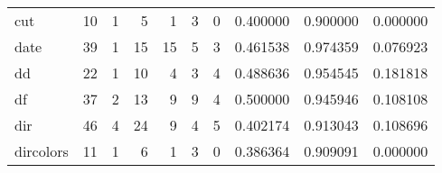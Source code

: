\begin{tabular}{lrrrrrrrrr}
cut       &                                       10 &                                                  1 &                                                  5 &                                                  1 &                                                  3 &                                                  0 &                                           0.400000 &                               0.900000 &                             0.000000 \\
date      &                                       39 &                                                  1 &                                                 15 &                                                 15 &                                                  5 &                                                  3 &                                           0.461538 &                               0.974359 &                             0.076923 \\
dd        &                                       22 &                                                  1 &                                                 10 &                                                  4 &                                                  3 &                                                  4 &                                           0.488636 &                               0.954545 &                             0.181818 \\
df        &                                       37 &                                                  2 &                                                 13 &                                                  9 &                                                  9 &                                                  4 &                                           0.500000 &                               0.945946 &                             0.108108 \\
dir       &                                       46 &                                                  4 &                                                 24 &                                                  9 &                                                  4 &                                                  5 &                                           0.402174 &                               0.913043 &                             0.108696 \\
dircolors &                                       11 &                                                  1 &                                                  6 &                                                  1 &                                                  3 &                                                  0 &                                           0.386364 &                               0.909091 &                             0.000000 \\

\end{tabular}
